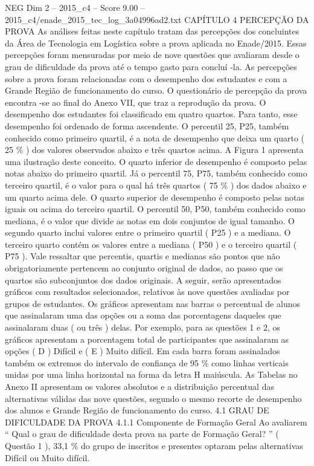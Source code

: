 \begin{textsample}{NEG Dim 2 – 2015\_c4 – Score 9.00 – 2015\_c4/enade\_2015\_tec\_log\_3a04996ad2.txt}  \label{ex:f2_neg_345}
CAPÍTULO 4 PERCEPÇÃO DA PROVA As análises feitas neste capítulo tratam das percepções dos concluintes da Área de Tecnologia em Logística sobre a prova aplicada no Enade/2015.
Essas percepções foram mensuradas por meio de nove questões que avaliaram desde o grau de dificuldade da prova até o tempo gasto para concluí -la.
As percepções sobre a prova foram relacionadas com o desempenho dos estudantes e com a Grande Região de funcionamento do curso.
O questionário de percepção da prova encontra -se ao final do Anexo VII, que traz a reprodução da prova.
O desempenho dos estudantes foi classificado em quatro quartos.
Para tanto, esse desempenho foi ordenado de forma ascendente.
O percentil 25, P25, também conhecido como primeiro quartil, é a nota de desempenho que deixa um quarto ( 25 \% ) dos valores observados abaixo e três quartos acima.
A Figura 1 apresenta uma ilustração deste conceito.
O quarto inferior de desempenho é composto pelas notas abaixo do primeiro quartil.
Já o percentil 75, P75, também conhecido como terceiro quartil, é o valor para o qual há três quartos ( 75 \% ) dos dados abaixo e um quarto acima dele.
O quarto superior de desempenho é composto pelas notas iguais ou acima do terceiro quartil.
O percentil 50, P50, também conhecido como mediana, é o valor que divide as notas em dois conjuntos de igual tamanho.
O segundo quarto inclui valores entre o primeiro quartil ( P25 ) e a mediana.
O terceiro quarto contém os valores entre a mediana ( P50 ) e o terceiro quartil ( P75 ).
Vale ressaltar que percentis, quartis e medianas são pontos que não obrigatoriamente pertencem ao conjunto original de dados, ao passo que os quartos são subconjuntos dos dados originais.
A seguir, serão apresentados gráficos com resultados selecionados, relativos às nove questões avaliadas por grupos de estudantes.
Os gráficos apresentam nas barras o percentual de alunos que assinalaram uma das opções ou a soma das porcentagens daqueles que assinalaram duas ( ou três ) delas.
Por exemplo, para as questões 1 e 2, os gráficos apresentam a porcentagem total de participantes que assinalaram as opções ( D ) Difícil e ( E ) Muito difícil.
Em cada barra foram assinalados também os extremos do intervalo de confiança de 95 \% como linhas verticais unidas por uma linha horizontal na forma da letra H maiúscula.
As Tabelas no Anexo II apresentam os valores absolutos e a distribuição percentual das alternativas válidas das nove questões, segundo o mesmo recorte de desempenho dos alunos e Grande Região de funcionamento do curso. 4.1 GRAU DE DIFICULDADE DA PROVA 4.1.1 Componente de Formação Geral Ao avaliarem “ Qual o grau de dificuldade desta prova na parte de Formação Geral? ” ( Questão 1 ), 33,1 \% do grupo de inscritos e presentes optaram pelas alternativas Difícil ou Muito difícil.

\end{textsample}
